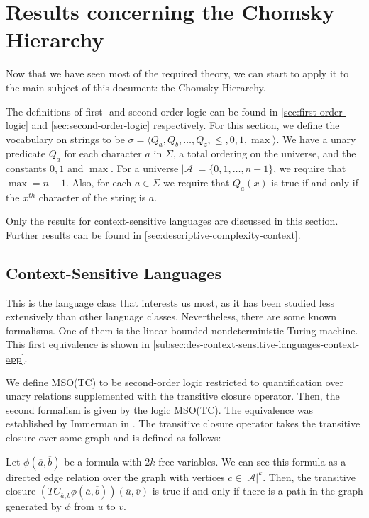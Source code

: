 \section{Results concerning the Chomsky Hierarchy}\label{sec:results-concerning-the-chomsky-hierarchy}

Now that we have seen most of the required theory, we can start to apply it to the main subject of this document: the Chomsky Hierarchy.

The definitions of first- and second-order logic can be found in \cref{sec:first-order-logic} and \cref{sec:second-order-logic} respectively.
For this section, we define the vocabulary on strings to be $\sigma = \langle Q_a, Q_b, \dots, Q_z, \leq , 0, 1, \max \rangle$.
We have a unary predicate $Q_a$ for each character $a$ in $\Sigma$, a total ordering on the universe, and the constants $0, 1$ and $\max$.
For a universe $| \mathcal{A} | = \{0, 1, \dots, n - 1\}$, we require that $\max = n - 1$.
Also, for each $a \in \Sigma$ we require that $Q_a(x)$ is true if and only if the $x^{th}$ character of the string is $a$.

Only the results for context-sensitive languages are discussed in this section.
Further results can be found in \cref{sec:descriptive-complexity-context}.

\subsection{Context-Sensitive Languages}\label{subsec:des-context-sensitive-languages}

This is the language class that interests us most, as it has been studied less extensively than other language classes.
Nevertheless, there are some known formalisms.
One of them is the linear bounded nondeterministic Turing machine.
This first equivalence is shown in \cref{subsec:des-context-sensitive-languages-context-app}.

We define MSO(TC) to be second-order logic restricted to quantification over unary relations supplemented with the transitive closure operator.
Then, the second formalism is given by the logic MSO(TC).
The equivalence was established by Immerman in \cite{Immerman1987}.
The transitive closure operator takes the transitive closure over some graph and is defined as follows:

\begin{define}
    Let $\phi\left(\overline{a}, \overline{b}\right)$ be a formula with $2k$ free variables.
    We can see this formula as a directed edge relation over the graph with vertices $\overline{c} \in | \mathcal{A} |^{k}$.
    Then, the transitive closure $\left(TC_{\overline{a}, \overline{b}}\phi\left(\overline{a}, \overline{b}\right)\right)\left(\overline{u}, \overline{v}\right)$ is true if and only if there is a path in the graph generated by $\phi$ from $\overline{u}$ to $\overline{v}$.
\end{define}

